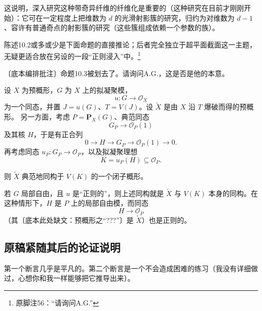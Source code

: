 这说明，深入研究这种带奇异纤维的纤维化是重要的（这种研究在目前才刚刚开始）：它可在一定程度上把维数为 $d$ 的光滑射影簇的研究，归约为对维数为 $d-1$、容许有普通奇点的射影簇的研究（这些簇组成依赖一个参数的族）。

陈述10.2或多或少是下面命题的直接推论；后者完全独立于超平面截面这一主题，无疑更适合放在另设的一段“正则浸入”中。\footnote{原脚注56：“请询问A.G.”}

〔底本编排批注〕命题10.3被划去了。请询问A.G.，这是否是他的本意。

设 $X$ 为预概形，$G$ 为 $X$ 上的拟凝聚模，
\[
u:G\longrightarrow\mathcal O_X
\]
为一个同态，并置 $J=u(G)$、$T=V(J)$。设 $\widetilde X$ 是由 $X$ 沿 $T$ 爆破而得的预概形。
另一方面，考虑 $P=\mathbf P_X(G)$、典范同态
\[
G_P\longrightarrow\mathcal O_P(1)
\]
及其核 $H$，于是有正合列
\[
0\longrightarrow H\longrightarrow G_P
\longrightarrow\mathcal O_P(1)\longrightarrow0.
\]
再考虑同态 $u_P:G_P\to\mathcal O_P$，以及拟凝聚理想
\[
K=u_P(H)\subseteq\mathcal O_P.
\]

则 $\widetilde X$ 典范地同构于 $V(K)$ 的一个闭子概形。

若 $G$ 局部自由，且 $u$ 是“正则的”，则上述同构就是 $\widetilde X$ 与 $V(K)$ 本身的同构。在这种情形下，$H$ 是 $P$ 上的局部自由模，而同态
\[
H\longrightarrow\mathcal O_P
\]
（其〔底本此处缺文：预概形之“???”〕是 $\widetilde X$）也是正则的。

\subsection*{原稿紧随其后的论证说明}
第一个断言几乎是平凡的。第二个断言是一个不会造成困难的练习（我没有详细做过，心想你和我一样能够把它推导出来）。

